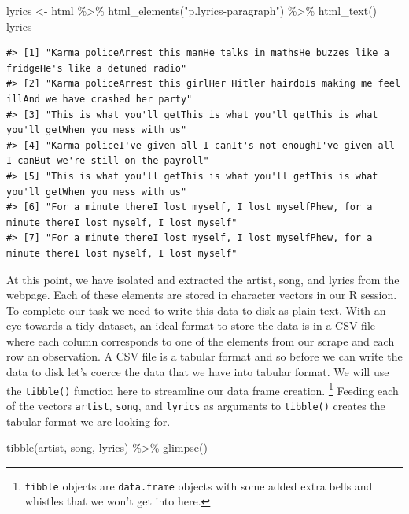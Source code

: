 \documentclass[
  letterpaper,
]{latex/krantz}
\newenvironment{Shaded}{\begin{snugshade}}{\end{snugshade}}
\newcommand{\FunctionTok}[1]{\textcolor[rgb]{0.28,0.35,0.67}{#1}}
\newcommand{\NormalTok}[1]{\textcolor[rgb]{0.00,0.23,0.31}{#1}}
\newcommand{\OtherTok}[1]{\textcolor[rgb]{0.00,0.23,0.31}{#1}}
\newcommand{\SpecialCharTok}[1]{\textcolor[rgb]{0.37,0.37,0.37}{#1}}
\newcommand{\StringTok}[1]{\textcolor[rgb]{0.13,0.47,0.30}{#1}}
\begin{document}
\begin{Shaded}
\begin{Highlighting}[]
\NormalTok{lyrics }\OtherTok{\textless{}{-}} 
\NormalTok{  html }\SpecialCharTok{\%\textgreater{}\%} 
  \FunctionTok{html\_elements}\NormalTok{(}\StringTok{"p.lyrics{-}paragraph"}\NormalTok{) }\SpecialCharTok{\%\textgreater{}\%} 
  \FunctionTok{html\_text}\NormalTok{()}
\NormalTok{lyrics}
\end{Highlighting}
\end{Shaded}

\begin{verbatim}
#> [1] "Karma policeArrest this manHe talks in mathsHe buzzes like a fridgeHe's like a detuned radio"      
#> [2] "Karma policeArrest this girlHer Hitler hairdoIs making me feel illAnd we have crashed her party"   
#> [3] "This is what you'll getThis is what you'll getThis is what you'll getWhen you mess with us"        
#> [4] "Karma policeI've given all I canIt's not enoughI've given all I canBut we're still on the payroll" 
#> [5] "This is what you'll getThis is what you'll getThis is what you'll getWhen you mess with us"        
#> [6] "For a minute thereI lost myself, I lost myselfPhew, for a minute thereI lost myself, I lost myself"
#> [7] "For a minute thereI lost myself, I lost myselfPhew, for a minute thereI lost myself, I lost myself"
\end{verbatim}

At this point, we have isolated and extracted the artist, song, and
lyrics from the webpage. Each of these elements are stored in character
vectors in our R session. To complete our task we need to write this
data to disk as plain text. With an eye towards a tidy dataset, an ideal
format to store the data is in a CSV file where each column corresponds
to one of the elements from our scrape and each row an observation. A
CSV file is a tabular format and so before we can write the data to disk
let's coerce the data that we have into tabular format. We will use the
\texttt{tibble()} function here to streamline our data frame creation.
\footnote{\texttt{tibble} objects are \texttt{data.frame} objects with
  some added extra bells and whistles that we won't get into here.}
Feeding each of the vectors \texttt{artist}, \texttt{song}, and
\texttt{lyrics} as arguments to \texttt{tibble()} creates the tabular
format we are looking for.

\begin{Shaded}
\begin{Highlighting}[]
\FunctionTok{tibble}\NormalTok{(artist, song, lyrics) }\SpecialCharTok{\%\textgreater{}\%} 
  \FunctionTok{glimpse}\NormalTok{()}
\end{Highlighting}
\end{Shaded}
\end{document}
